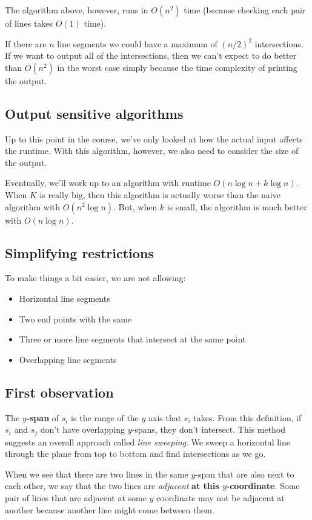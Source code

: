 \documentclass[11pt,a4paper,titlepage,dvipsnames,cmyk]{scrartcl}
\begin{document}
The algorithm above, however, runs in $O(n^2)$ time (because checking each
pair of lines takes $O(1)$ time).

If there are $n$ line segments we could have a maximum of $(n/2)^2$
intersections. If we want to output all of the intersections, then we
can't expect to do better than $O(n^2)$ in the worst case simply because
the time complexity of printing the output.

\subsection{Output sensitive algorithms}%
\label{sub:ouput-sensitive}
Up to this point in the course, we've only looked at how the actual
input affects the runtime. With this algorithm, however, we also need
to consider the size of the output.

Eventually, we'll work up to an algorithm with runtime $O(n \log n + k
\log n)$. When $K$ is really big, then this algorithm is actually worse
than the naive algorithm with $O(n^2 \log n)$. But, when $k$ is small, the
algorithm is much better with $O(n \log n)$.  

\newpage
\subsection{Simplifying restrictions}%
\label{sub:simplifying-restriction}
To make things a bit easier, we are not allowing:
\begin{itemize}
    \item Horizontal line segments
    \item Two end points with the same %
    \item Three or more line segments that intersect at the same point
    \item Overlapping line segments
\end{itemize}

\subsection{First observation}%
\label{sub:first-ob}
The \textbf{$y$-span} of $s_i$ is the range of the $y$ axis that $s_i$
takes. From this definition, if $s_i$ and $s_j$ don't have overlapping
$y$-spans, they don't intersect. This method suggests an overall approach
called \textit{line sweeping}. We sweep a horizontal line through the
plane from top to bottom and find intersections as we go.

When we see that there are two lines in the same $y$-span that are also
next to each other, we say that the two lines are \textit{adjacent}
\textbf{at this $y$-coordinate}. Some pair of lines that are adjacent at
some $y$ coordinate may not be adjacent at another because another line
might come between them.
\end{document}
